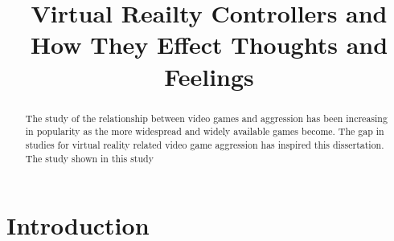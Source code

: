 \documentclass[journal]{IEEEtran}
\begin{document}
%
\title{Virtual Reailty Controllers and How They Effect Thoughts and Feelings}
%
%
\author{
}

\maketitle

\begin{abstract}
The study of the relationship between video games and aggression has been increasing in popularity as the more widespread and widely available games become. The gap in studies for virtual reality related video game aggression has inspired this dissertation. The study shown in this study
\end{abstract}

\section{Introduction}
\end{document}
